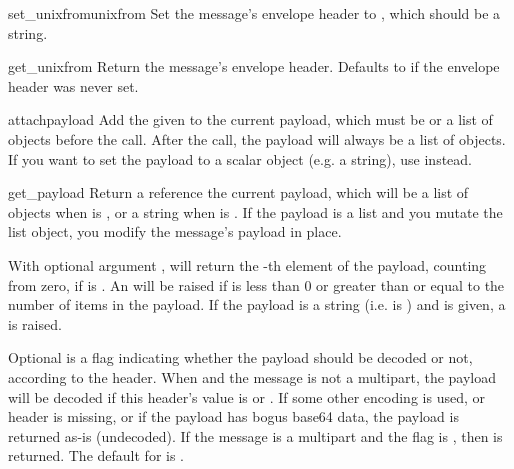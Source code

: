 \begin{methoddesc}[Message]{set_unixfrom}{unixfrom}
Set the message's envelope header to , which should be a string.
\end{methoddesc}

\begin{methoddesc}[Message]{get_unixfrom}{}
Return the message's envelope header.  Defaults to  if the
envelope header was never set.
\end{methoddesc}

\begin{methoddesc}[Message]{attach}{payload}
Add the given  to the current payload, which must be
 or a list of  objects before the call.
After the call, the payload will always be a list of 
objects.  If you want to set the payload to a scalar object (e.g. a
string), use  instead.
\end{methoddesc}

\begin{methoddesc}[Message]{get_payload}{}
Return a reference the current payload, which will be a list of
 objects when  is , or a
string when  is .  If the
payload is a list and you mutate the list object, you modify the
message's payload in place.

With optional argument ,  will return the
-th element of the payload, counting from zero, if
 is .  An 
will be raised if  is less than 0 or greater than or equal to
the number of items in the payload.  If the payload is a string
(i.e.  is ) and  is given, a
 is raised.

Optional  is a flag indicating whether the payload should be
decoded or not, according to the  header.
When  and the message is not a multipart, the payload will be
decoded if this header's value is  or
.  If some other encoding is used, or
 header is
missing, or if the payload has bogus base64 data, the payload is
returned as-is (undecoded).  If the message is a multipart and the
 flag is , then  is returned.  The
default for  is .
\end{methoddesc}

